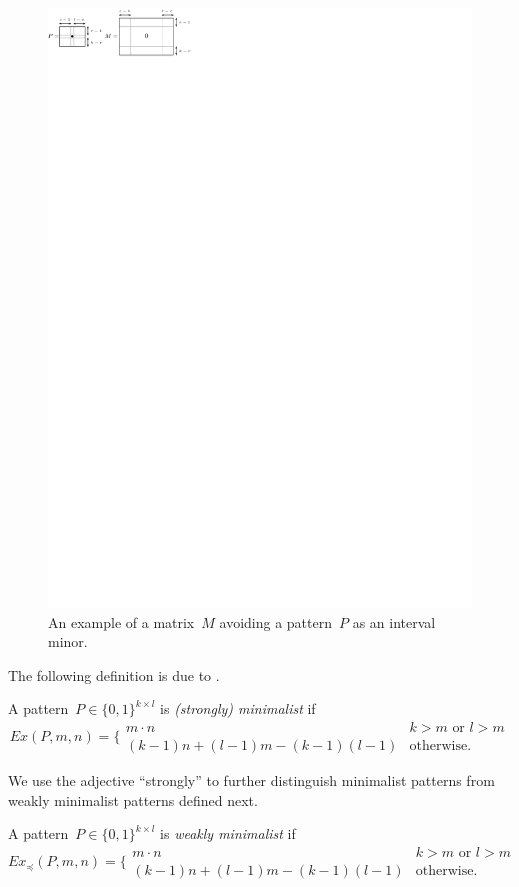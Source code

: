 \begin{figure}[!ht]
\centering
\includegraphics[width=120mm]{img/minimalist.pdf}
\caption{An example of a matrix~$M$ avoiding a pattern~$P$ as an interval minor.}
\label{fig:minimalist}
\end{figure}

The following definition is due to \cite{cibulka}.

\begin{defn}
A pattern~$P\in\{0,1\}^{k\times l}$ is \emph{(strongly) minimalist} if
$$Ex(P,m,n)=\Big\{\begin{array}{ll}
m\cdot n & k>m\text{ or } l>m \\
(k-1)n+(l-1)m-(k-1)(l-1) & \text{otherwise.}
\end{array}$$
\end{defn}

We use the adjective ``strongly'' to further distinguish minimalist patterns from weakly minimalist patterns defined next.

\begin{defn}
A pattern~$P\in\{0,1\}^{k\times l}$ is \emph{weakly minimalist} if
$$Ex_{\preceq}(P,m,n)=\Big\{\begin{array}{ll}
m\cdot n & k>m\text{ or } l>m \\
(k-1)n+(l-1)m-(k-1)(l-1) & \text{otherwise.}
\end{array}$$
\end{defn}


